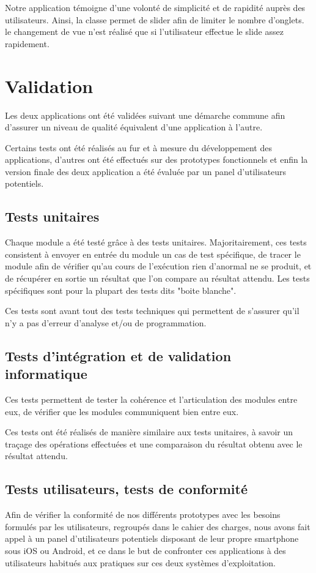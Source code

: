 \documentclass[a4paper, 11px]{article}
\begin{document}
Notre application témoigne d'une volonté de simplicité et de rapidité auprès des utilisateurs. Ainsi, la classe  permet de \og slider \fg afin de limiter le nombre d'onglets. le changement de vue n'est réalisé que si l'utilisateur effectue le slide assez rapidement.






\section{Validation}
Les deux applications ont été validées suivant une démarche commune afin d'assurer un niveau de qualité équivalent d'une application à l'autre.

Certains tests ont été réalisés au fur et à mesure du développement des applications, d'autres ont été effectués sur des prototypes fonctionnels et enfin la version finale des deux application a été évaluée par un panel d'utilisateurs potentiels.

\subsection{Tests unitaires}
Chaque module a été testé grâce à des tests unitaires. Majoritairement, ces tests consistent à envoyer en entrée du module un cas de test spécifique, de tracer le module afin de vérifier qu'au cours de l’exécution rien d'anormal ne se produit, et de récupérer en sortie un résultat que l'on compare au résultat attendu. Les tests spécifiques sont pour la plupart des tests dits "boite blanche".

Ces tests sont avant tout des tests techniques qui permettent de s'assurer qu'il n'y a pas d'erreur d'analyse et/ou de programmation.

\subsection{Tests d'intégration et de validation informatique}
Ces tests permettent de tester la cohérence et l'articulation des modules entre eux, de vérifier que les modules communiquent bien entre eux.

Ces tests ont été réalisés de manière similaire aux tests unitaires, à savoir un traçage des opérations effectuées et une comparaison du résultat obtenu avec le résultat attendu.

\subsection{Tests utilisateurs, tests de conformité}
Afin de vérifier la conformité de nos différents prototypes avec les besoins formulés par les utilisateurs, regroupés dans le cahier des charges, nous avons fait appel à un panel d'utilisateurs potentiels disposant de leur propre smartphone sous iOS ou Android, et ce dans le but de confronter ces applications à des utilisateurs habitués aux pratiques sur ces deux systèmes d'exploitation.
\end{document}

